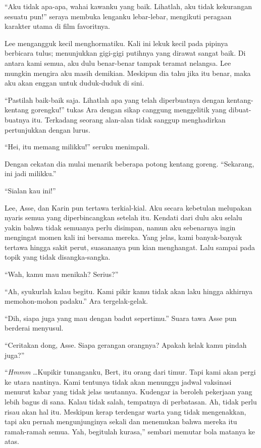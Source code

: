 \documentclass[smalldemyvopaper,11pt,twoside,onecolumn,openright,extrafontsizes]{memoir}
\begin{document}
``Aku tidak apa-apa, wahai kawanku yang baik. Lihatlah, aku tidak kekurangan sesuatu pun!'' seraya membuka lenganku lebar-lebar, mengikuti peragaan karakter utama di film favoritnya.

Lee mengangguk kecil menghormatiku. Kali ini lekuk kecil pada pipinya berbicara tulus; menunjukkan gigi-gigi putihnya yang dirawat sangat baik. Di antara kami semua, aku dulu benar-benar tampak teramat nelangsa. Lee mungkin mengira aku masih demikian. Meskipun dia tahu jika itu benar, maka aku akan enggan untuk duduk-duduk di sini.

``Pastilah baik-baik saja. Lihatlah apa yang telah diperbuatnya dengan kentang-kentang gorengku!'' tukas Ara dengan sikap canggung menggelitik yang dibuat-buatnya itu. Terkadang seorang alan-alan tidak sanggup menghadirkan pertunjukkan dengan lurus.

``Hei, itu memang milikku!'' seruku menimpali.

Dengan cekatan dia mulai menarik beberapa potong kentang goreng. ``Sekarang, ini jadi milikku.''

``Sialan kau ini!''


Lee, Asse, dan Karin pun tertawa terkial-kial. Aku secara kebetulan melupakan nyaris semua yang diperbincangkan setelah itu. Kendati dari dulu aku selalu yakin bahwa tidak semuanya perlu disimpan, namun aku sebenarnya ingin mengingat momen kali ini bersama mereka. Yang jelas, kami banyak-banyak tertawa hingga sakit perut, suasananya pun kian menghangat. Lalu sampai pada topik yang tidak disangka-sangka.

``Wah, kamu mau menikah? Serius?''

``Ah, syukurlah kalau begitu. Kami pikir kamu tidak akan laku hingga akhirnya memohon-mohon padaku.'' Ara tergelak-gelak.

``Dih, siapa juga yang mau dengan badut sepertimu.'' Suara tawa Asse pun berderai menyusul.


``Ceritakan dong, Asse. Siapa gerangan orangnya? Apakah kelak kamu pindah juga?''


``\textit{Hmmm} \dots Kupikir tunanganku, Bert, itu orang dari timur. Tapi kami akan pergi ke utara nantinya. Kami tentunya tidak akan menunggu jadwal vaksinasi menurut kabar yang tidak jelas usutannya. Kudengar ia beroleh pekerjaan yang lebih bagus di sana. Kalau tidak salah, tempatnya di perbatasan. Ah, tidak perlu risau akan hal itu. Meskipun kerap terdengar warta yang tidak mengenakkan, tapi aku pernah mengunjunginya sekali dan menemukan bahwa mereka itu ramah-ramah semua. Yah, begitulah kurasa,'' sembari memutar bola matanya ke atas.
\end{document}
